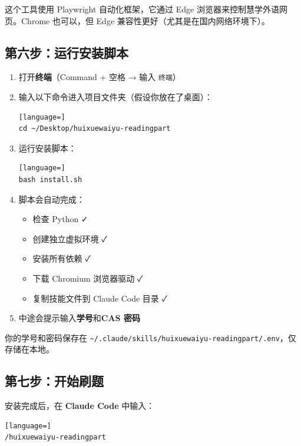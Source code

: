 \documentclass[12pt,a4paper]{ctexart}
\newcommand{\cmdSpace}{\faApple{}Command + 空格}
\begin{document}
\begin{tipbox}
  这个工具使用 Playwright 自动化框架，它通过 Edge 浏览器来控制慧学外语网页。Chrome
  也可以，但 Edge 兼容性更好（尤其是在国内网络环境下）。
\end{tipbox}

\subsection{第六步：运行安装脚本}

\begin{enumerate}
  \item 打开\textbf{终端}（\cmdSpace{} → 输入 \texttt{终端}）
  \item 输入以下命令进入项目文件夹（假设你放在了桌面）：
    \begin{lstlisting}[language=]
cd ~/Desktop/huixuewaiyu-readingpart
\end{lstlisting}
  \item 运行安装脚本：
    \begin{lstlisting}[language=]
bash install.sh
\end{lstlisting}
  \item 脚本会自动完成：
    \begin{itemize}[nosep]
      \item 检查 Python \faCheck{}
      \item 创建独立虚拟环境 \faCheck{}
      \item 安装所有依赖 \faCheck{}
      \item 下载 Chromium 浏览器驱动 \faCheck{}
      \item 复制技能文件到 Claude Code 目录 \faCheck{}
    \end{itemize}
  \item 中途会提示输入\textbf{学号}和\textbf{CAS 密码}
\end{enumerate}

\begin{tipbox}
  你的学号和密码保存在
  \texttt{\textasciitilde/.claude/skills/huixuewaiyu-readingpart/.env}，仅存储在本地。
\end{tipbox}

\subsection{第七步：开始刷题}

安装完成后，在 \textbf{Claude Code} 中输入：

\begin{lstlisting}[language=]
/huixuewaiyu-readingpart
\end{lstlisting}
\end{document}
